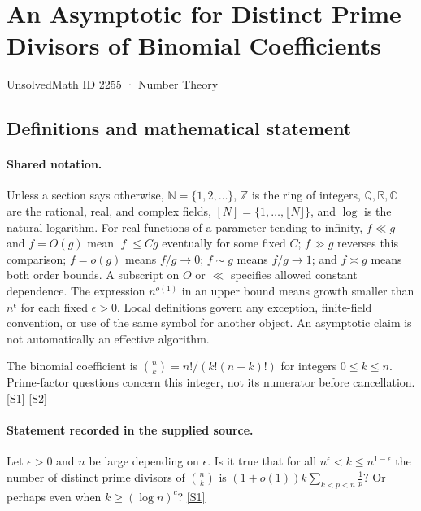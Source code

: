\documentclass[11pt,a4paper]{article}
\newcommand{\N}{\mathbb{N}}
\newcommand{\Z}{\mathbb{Z}}
\newcommand{\Q}{\mathbb{Q}}
\newcommand{\R}{\mathbb{R}}
\newcommand{\C}{\mathbb{C}}
\newcommand{\sref}[2]{\hyperlink{source:#1:#2}{[S#2]}}
\begin{document}

\setcounter{section}{2254}

\section{An Asymptotic for Distinct Prime Divisors of Binomial Coefficients}\label{2255}

{\small\sffamily UnsolvedMath ID 2255 · Number Theory}

\subsection{Definitions and mathematical statement}

\paragraph{Shared notation.}Unless a section says otherwise, $\N=\{1,2,\ldots\}$,
$\Z$ is the ring of integers, $\Q,\R,\C$ are the rational, real, and complex
fields, $[N]=\{1,\ldots,\lfloor N\rfloor\}$, and $\log$ is the natural
logarithm. For real functions of a parameter tending to infinity,
$f\ll g$ and $f=O(g)$ mean $|f|\leq Cg$ eventually for some fixed $C$;
$f\gg g$ reverses this comparison; $f=o(g)$ means $f/g\to0$;
$f\sim g$ means $f/g\to1$; and $f\asymp g$ means both order bounds.
A subscript on $O$ or $\ll$ specifies allowed constant dependence.
The expression $n^{o(1)}$ in an upper bound means growth smaller than
$n^\epsilon$ for each fixed $\epsilon>0$. Local definitions govern any
exception, finite-field convention, or use of the same symbol for another
object. An asymptotic claim is not automatically an effective algorithm.



The binomial coefficient is $\binom nk=n!/(k!(n-k)!)$ for integers $0\leq k\leq n$. Prime-factor questions concern this integer, not its numerator before cancellation. \sref{2255}{1} \sref{2255}{2}

\paragraph{Statement recorded in the supplied source.}
Let $\epsilon>0$ and $n$ be large depending on $\epsilon$. Is it true that for all $n^\epsilon<k\leq n^{1-\epsilon}$ the number of distinct prime divisors of $\binom{n}{k}$ is $ (1+o(1))k\sum_{k<p<n}\frac{1}{p}? $ Or perhaps even when $k \geq (\log n)^c$? \sref{2255}{1}
\end{document}
